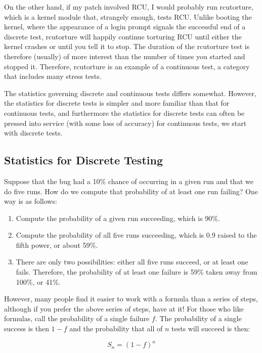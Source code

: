On the other hand, if my patch involved RCU, I would probably run
rcutorture, which is a kernel module that, strangely enough, tests RCU.
Unlike booting the kernel, where the appearance of a login prompt
signals the successful end of a discrete test, rcutorture will happily
continue torturing RCU until either the kernel crashes or until you
tell it to stop.
The duration of the rcutorture test is therefore (usually) of more
interest than the number of times you started and stopped it.
Therefore, rcutorture is an example of a continuous test, a category
that includes many stress tests.

The statistics governing discrete and continuous tests differs somewhat.
However, the statistics for discrete tests is simpler and more
familiar than that for continuous tests, and furthermore the
statistics for discrete tests can often be pressed into service
(with some loss of accuracy) for continuous tests, we start with
discrete tests.

\subsection{Statistics for Discrete Testing}
\label{sec:Statistics for Discrete Testing}

Suppose that the bug had a 10\% chance of occurring in
a given run and that we do five runs.
How do we compute that probability of at least one run failing?
One way is as follows:

\begin{enumerate}
\item	Compute the probability of a given run succeeding, which is 90\%.
\item	Compute the probability of all five runs succeeding, which
	is 0.9 raised to the fifth power, or about 59\%.
\item	There are only two possibilities: either all five runs succeed,
	or at least one fails.
	Therefore, the probability of at least one failure is
	59\% taken away from 100\%, or 41\%.
\end{enumerate}

However, many people find it easier to work with a formula than a series
of steps, although if you prefer the above series of steps, have at it!
For those who like formulas, call the probability of a single failure $f$.
The probability of a single success is then $1-f$ and the probability
that all of $n$ tests will succeed is then:

\begin{equation}
	S_n = \left(1-f\right)^n
\end{equation}

